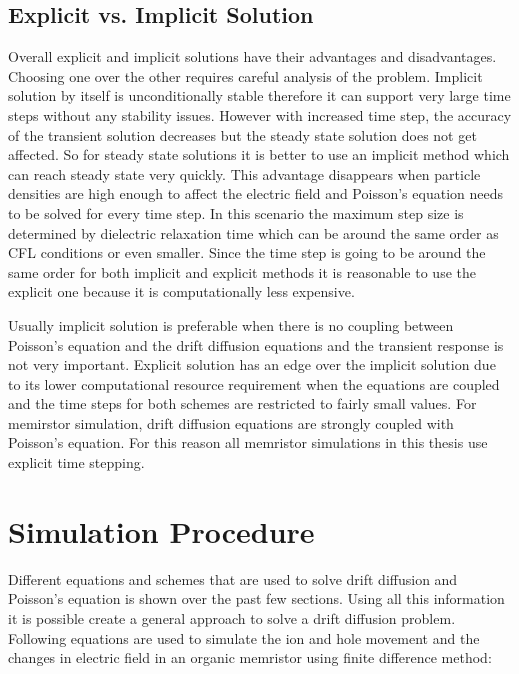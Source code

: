 \begin{doublespace}
\subsection{Explicit vs. Implicit Solution}

Overall explicit and implicit solutions have their advantages and disadvantages. Choosing one over the other requires careful analysis of the problem. Implicit solution by itself is unconditionally stable therefore it can support very large time steps without any stability issues. However with increased time step, the accuracy of the transient solution decreases but the steady state solution does not get affected. So for steady state solutions it is better to use an implicit method which can reach steady state very quickly. This advantage disappears when particle densities are high enough to affect the electric field and Poisson's equation needs to be solved for every time step. In this scenario the maximum step size is determined by dielectric relaxation time which can be around the same order as CFL conditions or even smaller. Since the time step is going to be around the same order for both implicit and explicit methods it is reasonable to use the explicit one because it is computationally less expensive.

Usually implicit solution is preferable when there is no coupling between Poisson's equation and the drift diffusion equations and the transient response is not very important. Explicit solution has an edge over the implicit solution due to its lower computational resource requirement when the equations are coupled and the time steps for both schemes are restricted to fairly small values. For memirstor simulation, drift diffusion equations are strongly coupled with Poisson's equation. For this reason all memristor simulations in this thesis use explicit time stepping. 


\clearpage
\section{Simulation Procedure}
Different equations and schemes that are used to solve drift diffusion and Poisson's equation is shown over the past few sections. Using all this information it is possible create a general approach to solve a drift diffusion problem. Following equations are used to simulate the ion and hole movement and the changes in electric field in an organic memristor using finite difference method:


\end{doublespace}
